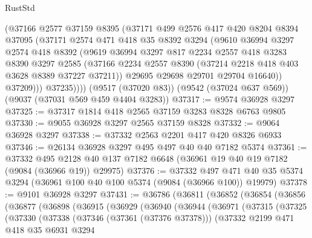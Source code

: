 \begin{lexlean}{RustStd}
\begin{coremodule}
            (@37166
              @2577
              @37159
              @8395
              (@37171
                @499
                @2576
                @417
                @420
                @8204
                @8394
                @37095
                (@37171
                  @2574
                  @471
                  @418
                  @35
                  @8392
                  @3294
                  (@9610
                    @36994
                    @3297
                    @2574
                    @418
                    @8392
                    (@9619
                      @36994
                      @3297
                      @817
                      @2234
                      @2557
                      @418
                      @3283
                      @8390
                      @3297
                      @2585
                      (@37166 @2234 @2557 @8390 (@37214 @2218 @418 @403 @3628 @8389 @37227 @37211))
                      @29695
                      @29698
                      @29701
                      @29704
                      @16640))
                  @37209)))
            @37235))))
    (@9517 (@37020 @83))
    (@9542 (@37024 @637 @569))
    (@9037 (@37031 @569 @459 @4404 @3283))
@37317 := @9574 @36928 @3297
@37325 := @37317 @1814 @418 @2565 @37159 @3283 @8328 @6763 @9805
@37330 := @9055 @36928 @3297 @2565 @37159 @8328
@37332 := @9064 @36928 @3297
@37338 := @37332 @2563 @2201 @417 @420 @8326 @6933
@37346 := @26134 @36928 @3297 @495 @497 @40 @40 @7182 @5374
@37361 := @37332
    @495
    @2128
    @40
    @137
    @7182
    @6648
    (@36961 @19 @40 @19 @7182 (@9084 (@36966 @19)) @29975)
@37376 := @37332
    @497
    @471
    @40
    @35
    @5374
    @3294
    (@36961 @100 @40 @100 @5374 (@9084 (@36966 @100)) @19979)
@37378 := @9101 @36928 @3297
@37431 := @36786
    (@36811
      (@36852
        (@36854
          (@36856
            (@36877
              (@36898
                (@36915
                  (@36929
                    (@36940
                      (@36944
                        (@36971
                          (@37315
                            (@37325
                              (@37330
                                (@37338
                                  (@37346 (@37361 (@37376 @37378)))
                                  (@37332
                                    @2199
                                    @471
                                    @418
                                    @35
                                    @6931
                                    @3294

\end{coremodule}
\end{lexlean}
